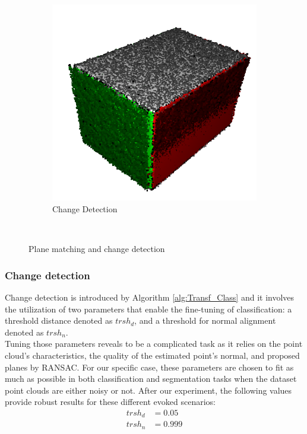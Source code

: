 \begin{figure}
\begin{subfigure}{.48\linewidth}
    \includegraphics[scale=0.4]{Img/06_change_detection.png}
    \caption{Change Detection}
    \label{fig:06_change_detection}
    \end{subfigure}\\
    \caption{Plane matching and change detection}
\end{figure}


\subsubsection{Change detection}
Change detection is introduced by Algorithm \ref{alg:Transf_Class} and it involves the utilization of two parameters that enable the fine-tuning of classification: a threshold distance denoted as $trsh_d$, and a threshold for normal alignment denoted as $trsh_n$.\\

Tuning those parameters reveals to be a complicated task as it relies on the point cloud's characteristics, the quality of the estimated point's normal, and proposed planes by RANSAC. 
For our specific case, these parameters are chosen to fit as much as possible in both classification and segmentation tasks when the dataset point clouds are either noisy or not. After our experiment, the following values provide robust results for these different evoked scenarios:
\begin{align*}
    trsh_d &= 0.05\\
    trsh_n &= 0.999
\end{align*}
